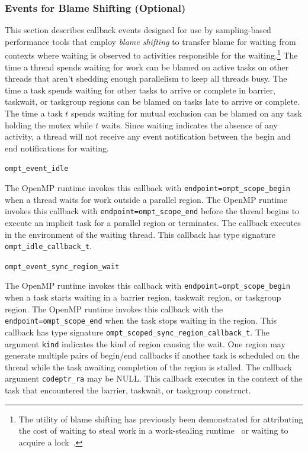 \documentclass{article}
\begin{document}
\subsubsection{Events for Blame Shifting (Optional)}
\label{sec:blame}
This section describes callback events designed for use by sampling-based performance tools 
that employ {\em blame shifting} to transfer blame for waiting from contexts 
where waiting is observed to activities responsible for the waiting.\footnote{The utility of blame shifting has previously been demonstrated for attributing the cost of waiting to steal work 
in a work-stealing runtime~\cite{Tallent:PPoPP09} or waiting to acquire a lock~\cite{Tallent:PPoPP10}.}
The time a thread spends waiting for work can be blamed on active tasks on other threads that aren't shedding enough parallelism to keep all threads busy. 
The time a task spends waiting for other tasks to arrive or complete in barrier, taskwait, or taskgroup regions can be blamed on tasks late to arrive or complete.
The time a task $t$ spends waiting for mutual exclusion can be blamed on any task holding the mutex while $t$ waits.
Since waiting indicates the absence of any activity, a thread will not receive any event notification between the begin and end notifications for waiting.

\begin{description}

\item \lstinline|ompt_event_idle|

  \sloppy
  The OpenMP runtime invokes this callback with \lstinline|endpoint=|\lstinline|ompt_scope_begin| when a thread waits for work outside a parallel region.
  The OpenMP runtime invokes this callback with \lstinline|endpoint=|\lstinline|ompt_scope_end| before the thread  begins to execute an implicit task for
   a parallel region or terminates. The callback executes in the environment of the waiting thread.  
  This callback has type signature \lstinline|ompt_idle_callback_t|. 

\end{description}

\begin{description}

\item \lstinline|ompt_event_sync_region_wait|

  The OpenMP runtime invokes this callback with \lstinline|endpoint=|\lstinline|ompt_scope_begin| when a task starts waiting in a barrier region, taskwait region, or taskgroup region.
   The OpenMP runtime invokes this callback with the \lstinline|endpoint=|\lstinline|ompt_scope_end| when the task stops waiting in the region.
  This callback has type signature \lstinline|ompt_scoped_sync_region_callback_t|. 
   The argument \lstinline|kind| indicates the kind of region causing the wait. 
   One region may generate multiple pairs of begin/end callbacks if another task is scheduled on the thread while the task awaiting completion of the region is stalled.
   The callback argument \lstinline|codeptr_ra| may be NULL.
   This callback executes in the context of the task that encountered the barrier, taskwait, or taskgroup construct. 

\end{description}
\end{document}
